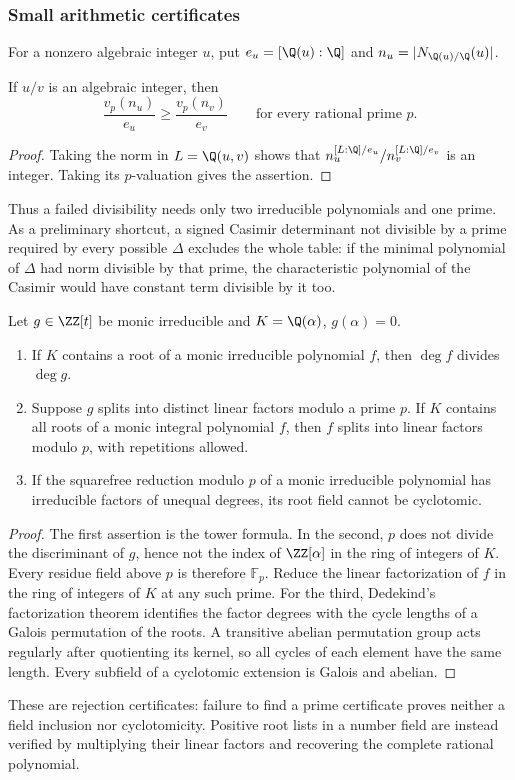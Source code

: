 \subsubsection{Small arithmetic certificates}
For a nonzero algebraic integer $u$, put
$e_u=[\Q(u):\Q]$ and $n_u=|N_{\Q(u)/\Q}(u)|$.
\begin{lemma}\label{finite:lem:norm}
If $u/v$ is an algebraic integer, then
\begin{equation}\label{finite:eq:norm}
 \frac{v_p(n_u)}{e_u}\geq\frac{v_p(n_v)}{e_v}
 \qquad\text{for every rational prime }p.
\end{equation}
\end{lemma}
\begin{proof}
Taking the norm in $L=\Q(u,v)$ shows that
$n_u^{[L:\Q]/e_u}/n_v^{[L:\Q]/e_v}$ is an integer. Taking its
$p$-valuation gives the assertion.
\end{proof}
Thus a failed divisibility needs only two irreducible polynomials and one
prime. As a preliminary shortcut, a signed Casimir determinant not divisible
by a prime required by every possible $\Delta$ excludes the whole table:
if the minimal polynomial of $\Delta$ had norm divisible by that prime,
the characteristic polynomial of the Casimir would have constant term
divisible by it too.

\begin{lemma}\label{finite:lem:field-prime}
Let $g\in\ZZ[t]$ be monic irreducible and
$K=\Q(\alpha)$, $g(\alpha)=0$.
\begin{enumerate}
\item If $K$ contains a root of a monic irreducible polynomial $f$, then
$\deg f$ divides $\deg g$.
\item Suppose $g$ splits into distinct linear factors modulo a prime $p$.
If $K$ contains all roots of a monic integral polynomial $f$, then $f$
splits into linear factors modulo $p$, with repetitions allowed.
\item If the squarefree reduction modulo $p$ of a monic irreducible
polynomial has irreducible factors of unequal degrees, its root field
cannot be cyclotomic.
\end{enumerate}
\end{lemma}
\begin{proof}
The first assertion is the tower formula. In the second, $p$ does not
divide the discriminant of $g$, hence not the index of
$\ZZ[\alpha]$ in the ring of integers of $K$. Every residue field
above $p$ is therefore $\mathbb F_p$. Reduce the linear factorization of
$f$ in the ring of integers of $K$ at any such prime.
For the third, Dedekind's factorization theorem identifies the factor
degrees with the cycle lengths of a Galois permutation of the roots.
A transitive abelian permutation group acts regularly after quotienting
its kernel, so all cycles of each element have the same length.
Every subfield of a cyclotomic extension is Galois and abelian.
\end{proof}
These are rejection certificates: failure to find a prime certificate
proves neither a field inclusion nor cyclotomicity. Positive root lists in
a number field are instead verified by multiplying their linear factors
and recovering the complete rational polynomial.

